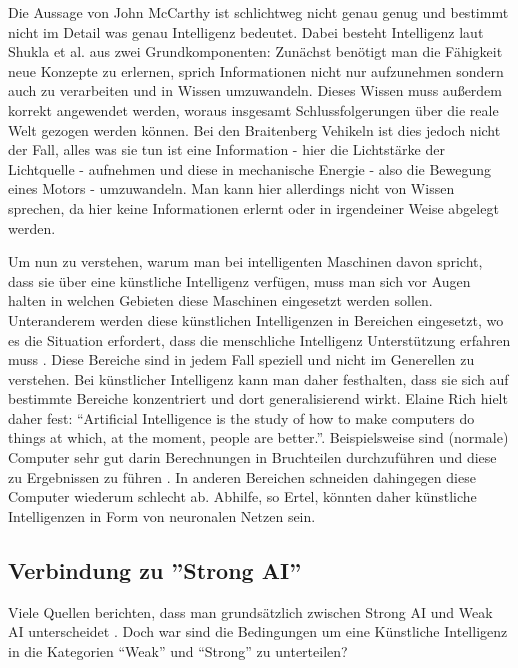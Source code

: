     Die Aussage von John McCarthy ist schlichtweg nicht genau genug und bestimmt nicht im Detail was
    genau Intelligenz bedeutet. Dabei besteht Intelligenz laut Shukla et al. aus zwei Grundkomponenten: 
    Zunächst benötigt man die Fähigkeit neue Konzepte zu erlernen, sprich Informationen nicht nur 
    aufzunehmen sondern auch zu verarbeiten und in Wissen umzuwandeln. Dieses Wissen muss außerdem 
    korrekt angewendet werden, woraus insgesamt Schlussfolgerungen über die reale Welt gezogen werden 
    können. \cite{shukla2013applicability} Bei den Braitenberg Vehikeln ist dies jedoch nicht der Fall,
    alles was sie tun ist eine Information - hier die Lichtstärke der Lichtquelle - aufnehmen und diese
    in mechanische Energie - also die Bewegung eines Motors - umzuwandeln. Man kann hier allerdings nicht
    von Wissen sprechen, da hier keine Informationen erlernt oder in irgendeiner Weise abgelegt werden.
    
    Um nun zu verstehen, warum man bei intelligenten Maschinen davon spricht, dass sie über eine 
    künstliche Intelligenz verfügen, muss man sich vor Augen halten in welchen Gebieten diese Maschinen
    eingesetzt werden sollen. Unteranderem werden diese künstlichen Intelligenzen in Bereichen eingesetzt,
    wo es die Situation erfordert, dass die menschliche Intelligenz Unterstützung erfahren muss
    \cite[p. 2]{ertel2016grundkurs}. Diese Bereiche sind in jedem Fall speziell und nicht im Generellen
    zu verstehen. Bei künstlicher Intelligenz kann man daher festhalten, dass sie sich auf bestimmte Bereiche
    konzentriert und dort generalisierend wirkt. Elaine Rich hielt daher fest: ``Artificial Intelligence
    is the study of how to make computers do things at which, at the moment, people are better.''.
    Beispielsweise sind (normale) Computer sehr gut darin Berechnungen in Bruchteilen durchzuführen und
    diese zu Ergebnissen zu führen \cite[p. 3]{ertel2016grundkurs}. In anderen Bereichen schneiden
    dahingegen diese Computer wiederum schlecht ab. Abhilfe, so Ertel, könnten daher künstliche Intelligenzen
    in Form von neuronalen Netzen sein.

    \subsection{Verbindung zu ''Strong AI''}
    Viele Quellen berichten, dass man grundsätzlich zwischen Strong AI und Weak AI unterscheidet
    \cite{huang_beef}. Doch war sind die Bedingungen um eine Künstliche Intelligenz in die Kategorien
    ``Weak'' und ``Strong'' zu unterteilen?


